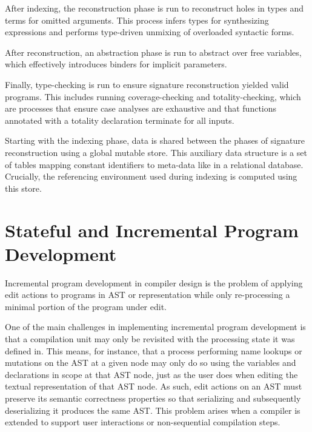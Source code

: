After indexing, the reconstruction phase is run to reconstruct holes in types and terms for omitted arguments.
This process infers types for synthesizing expressions and performs type-driven unmixing of overloaded syntactic forms.

After reconstruction, an abstraction phase is run to abstract over free variables, which effectively introduces binders for implicit parameters.

Finally, type-checking is run to ensure signature reconstruction yielded valid programs.
This includes running coverage-checking and totality-checking, which are processes that ensure case analyses are exhaustive and that functions annotated with a totality declaration terminate for all inputs.

Starting with the indexing phase, data is shared between the phases of signature reconstruction using a global mutable store.
This auxiliary data structure is a set of tables mapping constant identifiers to meta-data like in a relational database.
Crucially, the referencing environment used during indexing is computed using this store.



\section{Stateful and Incremental Program Development}

Incremental program development in compiler design is the problem of applying edit actions to programs in \ac{AST} or representation while only re-processing a minimal portion of the program under edit.

One of the main challenges in implementing incremental program development is that a compilation unit may only be revisited with the processing state it was defined in.
This means, for instance, that a process performing name lookups or mutations on the \ac{AST} at a given node may only do so using the variables and declarations in scope at that \ac{AST} node, just as the user does when editing the textual representation of that \ac{AST} node.
As such, edit actions on an \ac{AST} must preserve its semantic correctness properties so that serializing and subsequently deserializing it produces the same \ac{AST}.
This problem arises when a compiler is extended to support user interactions or non-sequential compilation steps.

